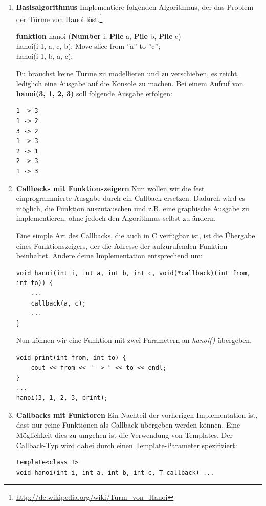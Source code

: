 \begin{enumerate}

\item \textbf{Basisalgorithmus}
Implementiere folgenden Algorithmus, der das Problem der Türme von Hanoi löst.\footnote{\url{http://de.wikipedia.org/wiki/Turm_von_Hanoi}}
\begin{algorithm}[H]
 \SetAlgoLined
 \textbf{funktion} hanoi (\textbf{Number} i, \textbf{Pile} a, \textbf{Pile} b, \textbf{Pile} c) { \\
      {
        hanoi(i-1, a, c, b); 
        Move slice from ''a'' to ''c''; \\
        hanoi(i-1, b, a, c); 
     }
 }
\end{algorithm}

Du brauchst keine Türme zu modellieren und zu verschieben, es reicht, lediglich eine Ausgabe auf die Konsole zu machen. Bei einem Aufruf von \textbf{hanoi(3, 1, 2, 3)} soll folgende Ausgabe erfolgen:
\begin{lstlisting}
1 -> 3
1 -> 2
3 -> 2
1 -> 3
2 -> 1
2 -> 3
1 -> 3
\end{lstlisting}

\item \textbf{Callbacks mit Funktionszeigern}
Nun wollen wir die fest einprogrammierte Ausgabe durch ein Callback ersetzen. Dadurch wird es möglich, die Funktion auszutauschen und z.B. eine graphische Ausgabe zu implementieren, ohne jedoch den Algorithmus selbst zu ändern.

Eine simple Art des Callbacks, die auch in C verfügbar ist, ist die Übergabe eines Funktionszeigers, der die Adresse der aufzurufenden Funktion beinhaltet.
Ändere deine Implementation entsprechend um:

\begin{lstlisting}
void hanoi(int i, int a, int b, int c, void(*callback)(int from, int to)) {
	...
	callback(a, c);
	...
}
\end{lstlisting}

Nun können wir eine Funktion mit zwei Parametern an \emph{hanoi()} übergeben.
\begin{lstlisting}
void print(int from, int to) {
	cout << from << " -> " << to << endl;
}
...
hanoi(3, 1, 2, 3, print);
\end{lstlisting}

\item \textbf{Callbacks mit Funktoren}
Ein Nachteil der vorherigen Implementation ist, dass nur reine Funktionen als Callback übergeben werden können.
Eine Möglichkeit dies zu umgehen ist die Verwendung von Templates.
Der Callback-Typ wird dabei durch einen Template-Parameter spezifiziert:
\begin{lstlisting}
template<class T>
void hanoi(int i, int a, int b, int c, T callback) ...
\end{lstlisting}


\end{enumerate}
